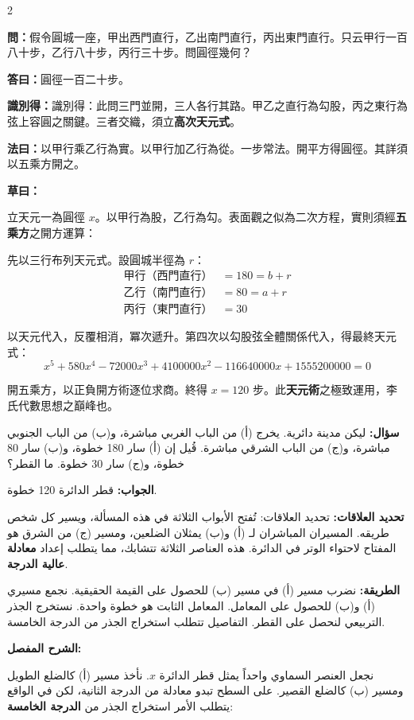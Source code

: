 \documentclass[11pt,a4paper]{article}
\newcommand{\ar}[1]{\arabicfont\beginR #1\endR}
\newcommand{\arb}[1]{\textbf{\arabicfont\beginR #1\endR}}
\newcommand{\arnote}[1]{\textcolor{arabicblue}{\ar{#1}}}
\newcommand{\wen}[1]{\par\noindent\textbf{\textcolor{probcolor}{問：}}{#1}\par}
\newcommand{\da}[1]{\par\noindent\textbf{\textcolor{anscolor}{答曰：}}{#1}\par}
\newcommand{\fayue}[1]{\par\noindent\textbf{\textcolor{methodcolor}{法曰：}}{#1}\par}
\newcommand{\caoyue}[1]{\par\noindent\textbf{草曰：}{#1}\par}
\newcommand{\zhi}[1]{\par\noindent\textbf{識別得：}{#1}\par}
\newcommand{\arwen}[1]{\par\noindent\arb{سؤال: }\arnote{#1}\par}
\newcommand{\arjwb}[1]{\par\noindent\arb{الجواب: }\arnote{#1}\par}
\newcommand{\arqwd}[1]{\par\noindent\arb{الطريقة: }\arnote{#1}\par}
\newcommand{\arshr}[1]{\par\noindent\arb{الشرح المفصل: }\arnote{#1}\par}
\newcommand{\arfl}[1]{\par\noindent\arb{تحديد العلاقات: }\arnote{#1}\par}
\begin{document}
\begin{paracol}{2}

\begin{leftcolumn}
\wen{假令圓城一座，甲出西門直行，乙出南門直行，丙出東門直行。只云甲行一百八十步，乙行八十步，丙行三十步。問圓徑幾何？}

\da{圓徑一百二十步。}

\zhi{識別得：此問三門並開，三人各行其路。甲乙之直行為勾股，丙之東行為弦上容圓之關鍵。三者交織，須立\textbf{高次天元式}。}

\fayue{以甲行乘乙行為實。以甲行加乙行為從。一步常法。開平方得圓徑。其詳須以五乘方開之。}

\caoyue{
立天元一為圓徑 $x$。以甲行為股，乙行為勾。表面觀之似為二次方程，實則須經\textbf{五乘方}之開方運算：

先以三行布列天元式。設圓城半徑為 $r$：
\begin{align*}
\text{甲行（西門直行）} &= 180 = b + r \\
\text{乙行（南門直行）} &= 80 = a + r \\
\text{丙行（東門直行）} &= 30
\end{align*}

以天元代入，反覆相消，冪次遞升。第四次以勾股弦全體關係代入，得最終天元式：
$$x^5 + 580x^4 - 72000x^3 + 4100000x^2 - 116640000x + 1555200000 = 0$$

開五乘方，以正負開方術逐位求商。終得 $x = 120$ 步。此\textbf{天元術}之極致運用，李氏代數思想之巔峰也。}
\end{leftcolumn}

\begin{rightcolumn}
\arwen{ليكن مدينة دائرية. يخرج (أ) من الباب الغربي مباشرة، و(ب) من الباب الجنوبي مباشرة، و(ج) من الباب الشرقي مباشرة. قُيل إن (أ) سار 180 خطوة، و(ب) سار 80 خطوة، و(ج) سار 30 خطوة. ما القطر؟}

\arjwb{قطر الدائرة 120 خطوة.}

\arfl{تحديد العلاقات: تُفتح الأبواب الثلاثة في هذه المسألة، ويسير كل شخص طريقه. المسيران المباشران لـ (أ) و(ب) يمثلان الضلعين، ومسير (ج) من الشرق هو المفتاح لاحتواء الوتر في الدائرة. هذه العناصر الثلاثة تتشابك، مما يتطلب إعداد \textbf{معادلة عالية الدرجة}.}

\arqwd{نضرب مسير (أ) في مسير (ب) للحصول على القيمة الحقيقية. نجمع مسيري (أ) و(ب) للحصول على المعامل. المعامل الثابت هو خطوة واحدة. نستخرج الجذر التربيعي لنحصل على القطر. التفاصيل تتطلب استخراج الجذر من الدرجة الخامسة.}

\arshr{نجعل العنصر السماوي واحداً يمثل قطر الدائرة $x$. نأخذ مسير (أ) كالضلع الطويل ومسير (ب) كالضلع القصير. على السطح تبدو معادلة من الدرجة الثانية، لكن في الواقع يتطلب الأمر استخراج الجذر من \textbf{الدرجة الخامسة}:

}
\end{rightcolumn}
\end{paracol}
\end{document}
